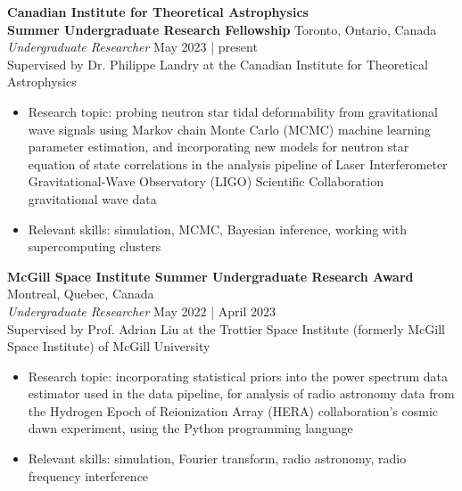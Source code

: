 \documentclass[a4paper,10pt]{extarticle}
\begin{document}
\textbf{Canadian Institute for Theoretical Astrophysics\\
    Summer Undergraduate Research Fellowship} \hfill Toronto, Ontario, Canada\\
\textit{Undergraduate Researcher} \hfill May 2023 | present\\
Supervised by Dr. Philippe Landry at the Canadian Institute for Theoretical Astrophysics
\begin{itemize}
    \item Research topic: probing neutron star tidal deformability from gravitational wave signals using Markov chain Monte Carlo (MCMC) machine learning parameter estimation, and incorporating new models for neutron star equation of state correlations in the analysis pipeline of Laser Interferometer Gravitational-Wave Observatory (LIGO) Scientific Collaboration gravitational wave data

    \item Relevant skills: simulation, MCMC, Bayesian inference, working with supercomputing clusters
\end{itemize}

 
\textbf{McGill Space Institute Summer Undergraduate Research Award} \hfill Montreal, Quebec, Canada\\
\textit{Undergraduate Researcher} \hfill May 2022 | April 2023\\
Supervised by Prof. Adrian Liu at the Trottier Space Institute (formerly McGill Space Institute) of McGill University
\begin{itemize}
    \item Research topic: incorporating statistical priors into the power spectrum data estimator used in the data pipeline, for analysis of radio astronomy data from the Hydrogen Epoch of Reionization Array (HERA) collaboration's cosmic dawn experiment, using the Python programming language


    \item Relevant skills: simulation, Fourier transform, radio astronomy, radio frequency interference
\end{itemize}
\end{document}

